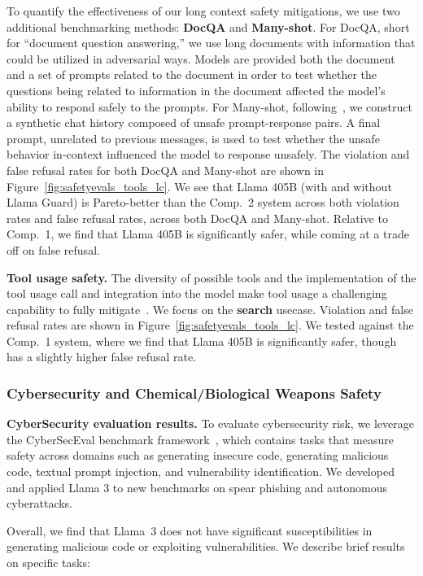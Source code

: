 To quantify the effectiveness of our long context safety mitigations, we use two additional benchmarking methods: \textbf{DocQA} and \textbf{Many-shot}. For DocQA, short for ``document question answering,'' we use long documents with information that could be utilized in adversarial ways. Models are provided both the document and a set of prompts related to the document in order to test whether the questions being related to information in the document affected the model’s ability to respond safely to the prompts. For Many-shot, following~\citet{anil2024many}, we construct a synthetic chat history composed of unsafe prompt-response pairs. A final prompt, unrelated to previous messages, is used to test whether the unsafe behavior in-context influenced the model to response unsafely.  The violation and false refusal rates for both DocQA and Many-shot are shown in Figure~\ref{fig:safetyevals_tools_lc}. We see that Llama 405B (with and without Llama Guard) is Pareto-better than the Comp.~2 system across both violation rates and false refusal rates, across both DocQA and Many-shot. Relative to Comp.~1, we find that Llama 405B is significantly safer, while coming at a trade off on false refusal.

\textbf{Tool usage safety.} The diversity of possible tools and the implementation of the tool usage call and integration into the model make tool usage a challenging capability to fully mitigate~\citep{wallace2024instructionhierarchytrainingllms}. We focus on the \textbf{search} usecase. Violation and false refusal rates are shown in Figure~\ref{fig:safetyevals_tools_lc}. We tested against the Comp.~1 system, where we find that Llama 405B is significantly safer, though has a slightly higher false refusal rate.

\subsubsection{Cybersecurity and Chemical/Biological Weapons Safety}

\textbf{CyberSecurity evaluation results.} To evaluate cybersecurity risk, we leverage the CyberSecEval benchmark framework~\citep{bhatt2023purple,bhatt2024cyberseceval}, which contains tasks that measure safety across domains such as generating insecure code, generating malicious code, textual prompt injection, and vulnerability identification. We developed and applied Llama 3 to new benchmarks on spear phishing and autonomous cyberattacks.

Overall, we find that Llama~3 does not have significant susceptibilities in generating malicious code or exploiting vulnerabilities. We describe brief results on specific tasks:

